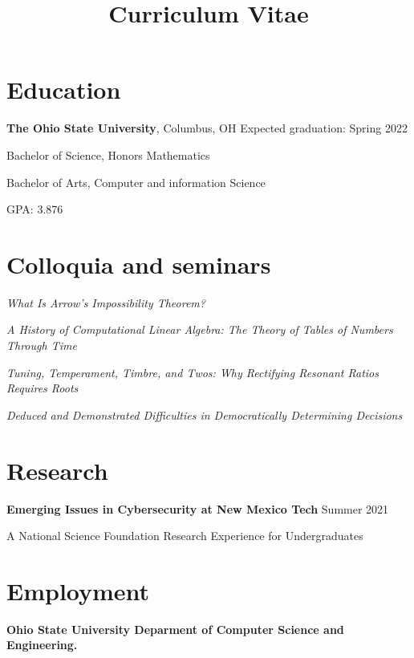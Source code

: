 \documentclass[10pt]{moderncv}
\title{Curriculum Vitae}
\begin{document}
\maketitle
\section*{Education}

\textbf{The Ohio State University}, Columbus, OH \hfill Expected graduation: Spring 2022

Bachelor of Science, Honors Mathematics

Bachelor of Arts, Computer and information Science

GPA: 3.876

\section*{Colloquia and seminars}

\textit{What Is Arrow's Impossibility Theorem?}
\newline {}

\textit{A History of Computational Linear Algebra: The Theory of Tables of Numbers Through Time}
\newline {}

\textit{Tuning, Temperament, Timbre, and Twos: Why Rectifying Resonant Ratios Requires Roots}
\newline {}

\textit{Deduced and Demonstrated Difficulties in Democratically Determining Decisions}
\newline {}

\section*{Research}

\textbf{Emerging Issues in Cybersecurity at New Mexico Tech} \hfill Summer 2021

A National Science Foundation Research Experience for Undergraduates

\section*{Employment}

\textbf{Ohio State University Deparment of Computer Science and Engineering.}
\end{document}
